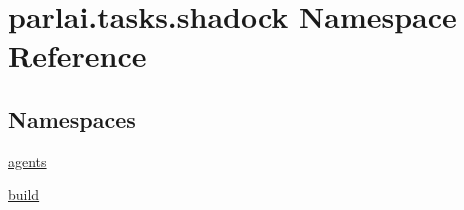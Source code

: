 \hypertarget{namespaceparlai_1_1tasks_1_1shadock}{}\section{parlai.\+tasks.\+shadock Namespace Reference}
\label{namespaceparlai_1_1tasks_1_1shadock}
\subsection*{Namespaces}
\begin{DoxyCompactItemize}
\item 
 \hyperlink{namespaceparlai_1_1tasks_1_1shadock_1_1agents}{agents}
\item 
 \hyperlink{namespaceparlai_1_1tasks_1_1shadock_1_1build}{build}
\end{DoxyCompactItemize}
